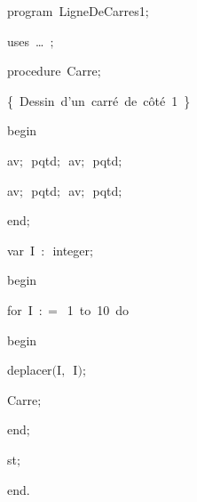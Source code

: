 
{
\parindent {}
\medskip

\carrenoir
\vspace{\neglskip}\mbox{\blc  \idt  \mcl program\idt \ LigneDeCarres1$;$
}\par 
\vspace{\neglskip}\mbox{\blc \blk\idt \mcl uses\idt \ \ldots\ $;$
}\par 
\medskip

\pagebreak[3] 
\vspace{\neglskip}\mbox{\blc  \blk\idt  \mcl procedure\idt \ Carre$;$}\par 
\vspace{\neglskip}\mbox{\blc  \blk\blk\idt  \cmt  \{\ Dessin\ d{'}un\ carré\ de\ côté\ 1\ \}\idt }\par 
\vspace{\neglskip}\mbox{\blc  \blk\idt  \mcl begin\idt }\par 
\vspace{\neglskip}\mbox{\blc  \blk\blk\idt  av$;$\ pqtd$;$\ av$;$\ pqtd$;$\ }\par 
\vspace{\neglskip}\mbox{\blc  \blk\blk\idt  av$;$\ pqtd$;$\ av$;$\ pqtd$;$}\par 
\vspace{\neglskip}\mbox{\blc  \blk\idt  \mcl end\idt $;$}\par 
\medskip

\pagebreak[3] 
\vspace{\neglskip}\mbox{\blc  \blk\idt  \mcl var\idt \ I\ $:$\ integer$;$}\par 
\medskip

\vspace{\neglskip}\mbox{\blc  \idt  \mcl begin\idt }\par 
\pagebreak[3] 
\vspace{\neglskip}\mbox{\blc  \blk\idt  \mcl for\idt \ I\ $:$$=$\ 1\ \mcl to\idt \ 10\ \mcl do\idt }\par 
\vspace{\neglskip}\mbox{\blc  \blk\blk\idt  \mcl begin\idt }\par 
\vspace{\neglskip}\mbox{\blc  \blk\blk\blk\idt  deplacer$($I$,$\ I$)$$;$}\par 
\vspace{\neglskip}\mbox{\blc  \blk\blk\blk\idt  Carre$;$}\par 
\vspace{\neglskip}\mbox{\blc  \blk\blk\idt  \mcl end\idt $;$}\par 
\vspace{\neglskip}\mbox{\blc  \blk\idt  st$;$}\par 
\vspace{\neglskip}\mbox{\blc  \idt  \mcl end\idt $.$}\par 

\medskip }


